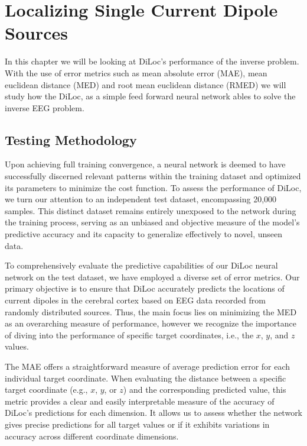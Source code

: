 \documentclass[a4paper, UKenglish, 11pt]{uiomaster}
\begin{document}
\chapter{Localizing Single Current Dipole Sources}
In this chapter we will be looking at DiLoc's performance of the inverse problem. With the use of error metrics such as mean absolute error (MAE), mean euclidean distance (MED) and root mean euclidean distance (RMED) we will study how the DiLoc, as a simple feed forward neural network ables to solve the inverse EEG problem.


\section{Testing Methodology}
Upon achieving full training convergence, a neural network is deemed to have successfully discerned relevant patterns within the training dataset and optimized its parameters to minimize the cost function. To assess the performance of DiLoc, we turn our attention to an independent test dataset, encompassing 20,000 samples. This distinct dataset remains entirely unexposed to the network during the training process, serving as an unbiased and objective measure of the model's predictive accuracy and its capacity to generalize effectively to novel, unseen data.

To comprehensively evaluate the predictive capabilities of our DiLoc neural network on the test dataset, we have employed a diverse set of error metrics. Our primary objective is to ensure that DiLoc accurately predicts the locations of current dipoles in the cerebral cortex based on EEG data recorded from randomly distributed sources. Thus, the main focus lies on minimizing the MED as an overarching measure of performance, however we recognize the importance of diving into the performance of specific target coordinates, i.e., the $x$, $y$, and $z$ values.

The MAE offers a straightforward measure of average prediction error for each individual target coordinate. When evaluating the distance between a specific target coordinate (e.g., $x$, $y$, or $z$) and the corresponding predicted value, this metric provides a clear and easily interpretable measure of the accuracy of DiLoc's predictions for each dimension. It allows us to assess whether the network gives precise predictions for all target values or if it exhibits variations in accuracy across different coordinate dimensions.
\end{document}
